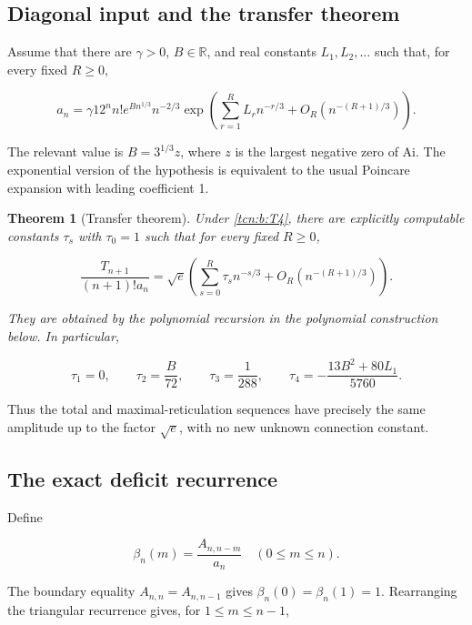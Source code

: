\documentclass[11pt,letterpaper]{article}
\newtheorem{theorem}{Theorem}[section]
\theoremstyle{remark}
\begin{document}
\subsection{Diagonal input and the transfer
theorem}\label{tcn:b:diagonal-input-and-the-transfer-theorem}

Assume that there are \(\gamma>0\), \(B\in\mathbb R\), and real
constants \(L_1,L_2,\ldots\) such that, for every fixed \(R\ge0\),

\[
 a_n=\gamma 12^n n!e^{Bn^{1/3}}n^{-2/3}
 \exp\left(\sum_{r=1}^R L_rn^{-r/3}+O_R(n^{-(R+1)/3})\right).
                                                               \tag{T4}\label{tcn:b:T4}
\]

The relevant value is \(B=3^{1/3}z\), where \(z\) is the largest
negative zero of Ai. The exponential version of the hypothesis is
equivalent to the usual Poincare expansion with leading coefficient 1.

\begin{theorem}[Transfer theorem]\label{tcn:b:thm:transfer}
Under \eqref{tcn:b:T4}, there are explicitly computable
constants \(\tau_s\) with \(\tau_0=1\) such that for every fixed \(R\ge0\),

\[
 \frac{T_{n+1}}{(n+1)!a_n}
 =\sqrt e\left(\sum_{s=0}^R \tau_sn^{-s/3}
              +O_R(n^{-(R+1)/3})\right).                       \tag{T5}\label{tcn:b:T5}
\]

They are obtained by the polynomial recursion in the polynomial
construction below. In particular,

\[
 \tau_1=0,\qquad \tau_2=\frac B{72},\qquad \tau_3=\frac1{288},\qquad
 \tau_4=-\frac{13B^2+80L_1}{5760}.                               \tag{T6}\label{tcn:b:T6}
\]
\end{theorem}

Thus the total and maximal-reticulation sequences have precisely the
same amplitude up to the factor \(\sqrt e\), with no new unknown
connection constant.

\subsection{The exact deficit
recurrence}\label{tcn:b:the-exact-deficit-recurrence}

Define

\[
 \beta_n(m)=\frac{A_{n,n-m}}{a_n}\quad(0\le m\le n).
\]

The boundary equality \(A_{n,n}=A_{n,n-1}\) gives \(\beta_n(0)=\beta_n(1)=1\).
Rearranging the triangular recurrence gives, for \(1\le m\le n-1\),
\end{document}
